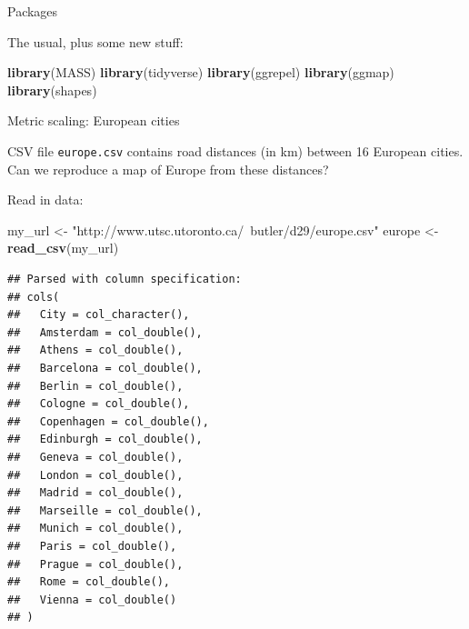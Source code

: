 \documentclass[ignorenonframetext,]{beamer}
\newenvironment{Shaded}{\begin{snugshade}}{\end{snugshade}}
\newcommand{\KeywordTok}[1]{\textcolor[rgb]{0.13,0.29,0.53}{\textbf{#1}}}
\newcommand{\NormalTok}[1]{#1}
\newcommand{\StringTok}[1]{\textcolor[rgb]{0.31,0.60,0.02}{#1}}
\begin{document}
\begin{frame}[fragile]{Packages}
\protect\hypertarget{packages-8}{}

The usual, plus some new stuff:

\begin{Shaded}
\begin{Highlighting}[]
\KeywordTok{library}\NormalTok{(MASS)}
\KeywordTok{library}\NormalTok{(tidyverse)}
\KeywordTok{library}\NormalTok{(ggrepel)}
\KeywordTok{library}\NormalTok{(ggmap)}
\KeywordTok{library}\NormalTok{(shapes)}
\end{Highlighting}
\end{Shaded}

\end{frame}

\begin{frame}[fragile]{Metric scaling: European cities}
\protect\hypertarget{metric-scaling-european-cities}{}

CSV file \texttt{europe.csv} contains road distances (in km) between 16
European cities. Can we reproduce a map of Europe from these distances?

Read in data:

\scriptsize

\begin{Shaded}
\begin{Highlighting}[]
\NormalTok{my_url <-}\StringTok{ "http://www.utsc.utoronto.ca/~butler/d29/europe.csv"}
\NormalTok{europe <-}\StringTok{ }\KeywordTok{read_csv}\NormalTok{(my_url)}
\end{Highlighting}
\end{Shaded}

\begin{verbatim}
## Parsed with column specification:
## cols(
##   City = col_character(),
##   Amsterdam = col_double(),
##   Athens = col_double(),
##   Barcelona = col_double(),
##   Berlin = col_double(),
##   Cologne = col_double(),
##   Copenhagen = col_double(),
##   Edinburgh = col_double(),
##   Geneva = col_double(),
##   London = col_double(),
##   Madrid = col_double(),
##   Marseille = col_double(),
##   Munich = col_double(),
##   Paris = col_double(),
##   Prague = col_double(),
##   Rome = col_double(),
##   Vienna = col_double()
## )
\end{verbatim}

\normalsize

\end{frame}
\end{document}
